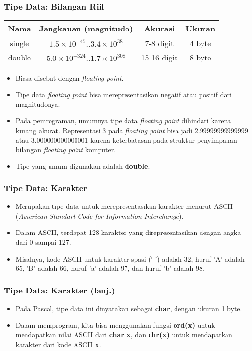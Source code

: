 \documentclass{beamer}
\begin{document}
\begin{frame}
\frametitle{Tipe Data: Bilangan Riil}
\begin{table}[ht]
	\begin{tabular}{|c|c|c|c|}
		\hline Nama  & Jangkauan (magnitudo) & Akurasi & Ukuran \\ 
		\hline single & $1.5\times10^{-45} .. 3.4\times10^{38}$ & 7-8 digit & 4 byte\\ 
		\hline double & $5.0\times10^{-324} .. 1.7\times10^{308}$ & 15-16 digit & 8 byte \\ 
		\hline 
	\end{tabular}
\end{table} 
\begin{itemize}
	\item Biasa disebut dengan \textit{floating point}.
	\item Tipe data \textit{floating point} bisa merepresentasikan negatif atau positif dari magnitudonya.
	\item Pada pemrograman, umumnya tipe data \textit{floating point} dihindari karena kurang akurat. Representasi 3 pada \textit{floating point} bisa jadi 2.99999999999999 atau 3.000000000000001 karena keterbatasan pada struktur penyimpanan bilangan \textit{floating point} komputer.
	\item Tipe yang umum digunakan adalah \alert{\textbf{double}}.
\end{itemize}
\end{frame}

\begin{frame}
\frametitle{Tipe Data: Karakter}
\begin{itemize}
	\item Merupakan tipe data untuk merepresentasikan karakter menurut ASCII (\textit{American Standart Code for Information Interchange}).
	\item Dalam ASCII, terdapat 128 karakter yang direpresentasikan dengan angka dari 0 sampai 127. 
	\item Misalnya, kode ASCII untuk karakter spasi (' ') adalah 32, huruf 'A' adalah 65, 'B' adalah 66, huruf 'a' adalah 97, dan huruf 'b' adalah 98.
\end{itemize}
\end{frame}

\begin{frame}
\frametitle{Tipe Data: Karakter (lanj.)}
\begin{itemize}
	\item Pada Pascal, tipe data ini dinyatakan sebagai \alert{\textbf{char}}, dengan ukuran 1 byte.
	\item Dalam memprogram, kita bisa menggunakan fungsi \textbf{ord(x)} untuk mendapatkan nilai ASCII dari \textbf{char x}, dan \textbf{chr(x)} untuk mendapatkan karakter dari kode ASCII \textbf{x}.
\end{itemize}
\end{frame}
\end{document}
